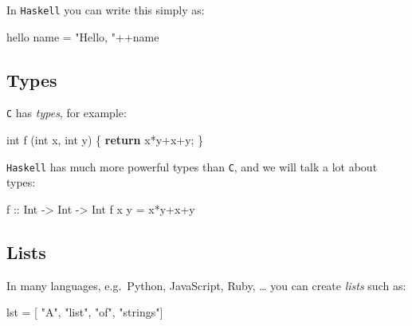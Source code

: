 \documentclass[11pt]{amsart}
\newenvironment{Shaded}{}{}
\newcommand{\KeywordTok}[1]{\textcolor[rgb]{0.00,0.44,0.13}{\textbf{{#1}}}}
\newcommand{\DataTypeTok}[1]{\textcolor[rgb]{0.56,0.13,0.00}{{#1}}}
\newcommand{\StringTok}[1]{\textcolor[rgb]{0.25,0.44,0.63}{{#1}}}
\newcommand{\OtherTok}[1]{\textcolor[rgb]{0.00,0.44,0.13}{{#1}}}
\newcommand{\FunctionTok}[1]{\textcolor[rgb]{0.02,0.16,0.49}{{#1}}}
\newcommand{\NormalTok}[1]{{#1}}
\begin{document}
In \texttt{Haskell} you can write this simply as:

\begin{Shaded}
\begin{Highlighting}[]
    \NormalTok{hello name }\FunctionTok{=} \StringTok{"Hello, "}\FunctionTok{++}\NormalTok{name}
\end{Highlighting}
\end{Shaded}

\subsection{Types}\label{types}

\texttt{C} has \emph{types}, for example:

\begin{Shaded}
\begin{Highlighting}[]
    \DataTypeTok{int} \NormalTok{f (}\DataTypeTok{int} \NormalTok{x, }\DataTypeTok{int} \NormalTok{y) \{}
        \KeywordTok{return} \NormalTok{x*y+x+y;}
    \NormalTok{\}}
\end{Highlighting}
\end{Shaded}

\texttt{Haskell} has much more powerful types than \texttt{C}, and we
will talk a lot about types:

\begin{Shaded}
\begin{Highlighting}[]
\OtherTok{    f ::} \DataTypeTok{Int} \OtherTok{->} \DataTypeTok{Int} \OtherTok{->} \DataTypeTok{Int}
    \NormalTok{f x y }\FunctionTok{=}  \NormalTok{x}\FunctionTok{*}\NormalTok{y}\FunctionTok{+}\NormalTok{x}\FunctionTok{+}\NormalTok{y}
\end{Highlighting}
\end{Shaded}

\subsection{Lists}\label{lists}

In many languages, e.g.~Python, JavaScript, Ruby, \ldots{} you can
create \emph{lists} such as:

\begin{Shaded}
\begin{Highlighting}[]
    \NormalTok{lst }\FunctionTok{=} \NormalTok{[ }\StringTok{"A"}\NormalTok{, }\StringTok{"list"}\NormalTok{, }\StringTok{"of"}\NormalTok{, }\StringTok{"strings"}\NormalTok{]}
\end{Highlighting}
\end{Shaded}
\end{document}
